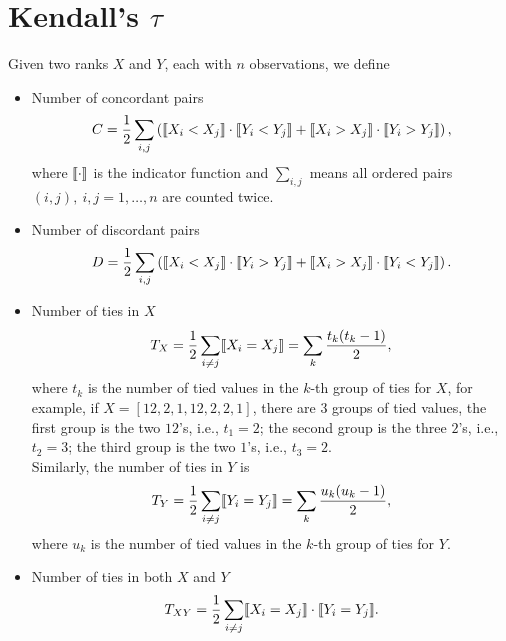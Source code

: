 \section{Kendall's $\tau$}
\label{sec:kendalltau}

Given two ranks $X$ and $Y$, each with $n$ observations, we define
\begin{itemize}
\item Number of concordant pairs 
      \begin{equation*}
      C = \frac{1}{2} \sum_{i,j} \left( \llbracket X_i < X_j \rrbracket \cdot \llbracket Y_i < Y_j \rrbracket + \llbracket X_i > X_j \rrbracket \cdot \llbracket Y_i > Y_j \rrbracket \right),
      \end{equation*}
      where $\llbracket \cdot \rrbracket$ is the indicator function and 
      $\sum_{i,j}$ means all ordered pairs $(i, j),~ i,j=1,\dots,n$ are counted twice.

\item Number of discordant pairs 
      \begin{equation*}
      D = \frac{1}{2} \sum_{i,j} \left( \llbracket X_i < X_j \rrbracket \cdot \llbracket Y_i > Y_j \rrbracket + \llbracket X_i > X_j \rrbracket \cdot \llbracket Y_i < Y_j \rrbracket \right).
      \end{equation*}

\item Number of ties in $X$
      \begin{equation*}
      T_X = \frac{1}{2} \sum_{i \ne j} \llbracket X_i = X_j \rrbracket = \sum_k \frac{t_k (t_k - 1)}{2},
      \end{equation*}
      where $t_k$ is the number of tied values in the $k$-th group of ties for $X$, for example, if
      $X = [12, 2, 1, 12, 2, 2, 1]$, there are $3$ groups of tied values, the first group is the two $12$'s, i.e., $t_1 = 2$;
      the second group is the three $2$'s, i.e., $t_2 = 3$; the third group is the two $1$'s, i.e., $t_3 = 2$. \\
      Similarly, the number of ties in $Y$ is 
      \begin{equation*}
      T_Y = \frac{1}{2} \sum_{i \ne j} \llbracket Y_i = Y_j \rrbracket = \sum_k \frac{u_k (u_k - 1)}{2},
      \end{equation*}
      where $u_k$ is the number of tied values in the $k$-th group of ties for $Y$.

\item Number of ties in both $X$ and $Y$
      \begin{equation*}
      T_{XY} = \frac{1}{2} \sum_{i \ne j} \llbracket X_i = X_j \rrbracket \cdot \llbracket Y_i = Y_j \rrbracket.
      \end{equation*}


\end{itemize}
